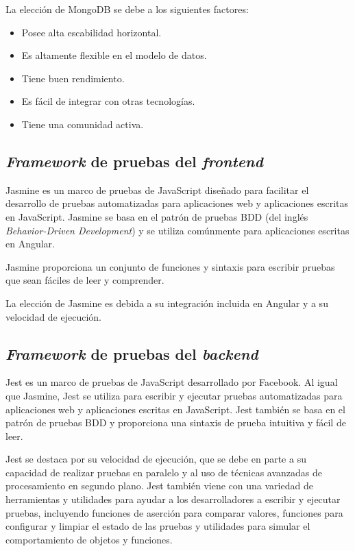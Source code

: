 
La elección de MongoDB se debe a los siguientes factores: 
\begin{itemize}
	\item Posee alta escabilidad horizontal.
	\item Es altamente flexible en el modelo de datos.
	\item Tiene buen rendimiento.
	\item Es fácil de integrar con otras tecnologías.
	\item Tiene una comunidad activa.
\end{itemize}

\subsection{\emph{Framework} de pruebas del \emph{frontend}}

Jasmine \citep{WEBSITE:JASMINE} es un marco de pruebas de JavaScript diseñado para facilitar el desarrollo de pruebas automatizadas para aplicaciones web y aplicaciones escritas en JavaScript. Jasmine se basa en el patrón de pruebas BDD (del inglés \textit{Behavior-Driven Development}) \citep{WEBSITE:BDD} y se utiliza comúnmente para aplicaciones escritas en Angular.

Jasmine proporciona un conjunto de funciones y sintaxis para escribir pruebas que sean fáciles de leer y comprender.

La elección de Jasmine es debida a su integración incluida en Angular y a su velocidad de ejecución.

\subsection{\emph{Framework} de pruebas del \emph{backend}}

Jest \citep{WEBSITE:JESTJS} es un marco de pruebas de JavaScript desarrollado por Facebook. Al igual que Jasmine, Jest se utiliza para escribir y ejecutar pruebas automatizadas para aplicaciones web y aplicaciones escritas en JavaScript. Jest también se basa en el patrón de pruebas BDD y proporciona una sintaxis de prueba intuitiva y fácil de leer.

Jest se destaca por su velocidad de ejecución, que se debe en parte a su capacidad de realizar pruebas en paralelo y al uso de técnicas avanzadas de procesamiento en segundo plano. Jest también viene con una variedad de herramientas y utilidades para ayudar a los desarrolladores a escribir y ejecutar pruebas, incluyendo funciones de aserción para comparar valores, funciones  para configurar y limpiar el estado de las pruebas y utilidades para simular el comportamiento de objetos y funciones.

